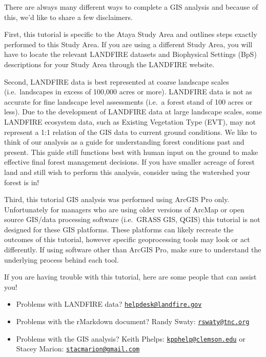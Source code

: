 \documentclass[
]{book}
\providecommand{\tightlist}{%
  \setlength{\itemsep}{0pt}\setlength{\parskip}{0pt}}
\begin{document}
There are always many different ways to complete a GIS analysis and because of this, we'd like to share a few disclaimers.

First, this tutorial is specific to the Ataya Study Area and outlines steps exactly performed to this Study Area. If you are using a different Study Area, you will have to locate the relevant LANDFIRE datasets and Biophysical Settings (BpS) descriptions for your Study Area through the LANDFIRE website.

Second, LANDFIRE data is best represented at coarse landscape scales (i.e.~landscapes in excess of 100,000 acres or more). LANDFIRE data is not as accurate for fine landscape level assessments (i.e.~a forest stand of 100 acres or less). Due to the development of LANDFIRE data at large landscape scales, some LANDFIRE ecosystem data, such as Existing Vegetation Type (EVT), may not represent a 1:1 relation of the GIS data to current ground conditions. We like to think of our analysis as a guide for understanding forest conditions past and present. This guide still functions best with human input on the ground to make effective final forest management decisions. If you have smaller acreage of forest land and still wish to perform this analysis, consider using the watershed your forest is in!

Third, this tutorial GIS analysis was performed using ArcGIS Pro only. Unfortunately for managers who are using older versions of ArcMap or open source GIS/data processing software (i.e.~GRASS GIS, QGIS) this tutorial is not designed for these GIS platforms. These platforms can likely recreate the outcomes of this tutorial, however specific geoprocessing tools may look or act differently. If using software other than ArcGIS Pro, make sure to understand the underlying process behind each tool.

If you are having trouble with this tutorial, here are some people that can assist you!

\begin{itemize}
\tightlist
\item
  Problems with LANDFIRE data? \href{mailto:helpdesk@landfire.gov}{\nolinkurl{helpdesk@landfire.gov}}
\item
  Problems with the rMarkdown document? Randy Swaty: \href{mailto:rswaty@tnc.org}{\nolinkurl{rswaty@tnc.org}}
\item
  Problems with the GIS analysis? Keith Phelps: \href{mailto:kpphelp@clemson.edu}{\nolinkurl{kpphelp@clemson.edu}} or Stacey Marion: \href{mailto:stacmarion@gmail.com}{\nolinkurl{stacmarion@gmail.com}}
\end{itemize}
\end{document}
